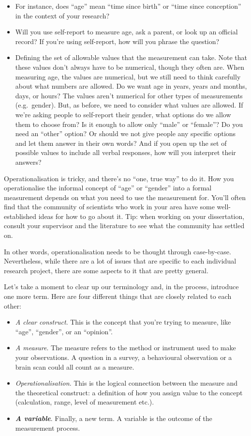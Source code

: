 \documentclass[
  11pt,
]{book}
\providecommand{\tightlist}{%
  \setlength{\itemsep}{0pt}\setlength{\parskip}{0pt}}
\theoremstyle{definition}
\theoremstyle{definition}
\theoremstyle{definition}
\theoremstyle{definition}
\theoremstyle{remark}
\begin{document}
\begin{itemize}
\tightlist
\item
  For instance, does ``age'' mean ``time since birth'' or ``time since conception'' in the context of your research?
\item
  Will you use self-report to measure age, ask a parent, or look up an official record? If you're using self-report, how will you phrase the question?
\item
  Defining the set of allowable values that the measurement can take. Note that these values don't always have to be numerical, though they often are. When measuring age, the values are numerical, but we still need to think carefully about what numbers are allowed. Do we want age in years, years and months, days, or hours? The values aren't numerical for other types of measurements (e.g.~gender). But, as before, we need to consider what values are allowed. If we're asking people to self-report their gender, what options do we allow them to choose from? Is it enough to allow only ``male'' or ``female''? Do you need an ``other'' option? Or should we not give people any specific options and let them answer in their own words? And if you open up the set of possible values to include all verbal responses, how will you interpret their answers?
\end{itemize}

Operationalisation is tricky, and there's no ``one, true way'' to do it. How you operationalise the informal concept of ``age'' or ``gender'' into a formal measurement depends on what you need to use the measurement for. You'll often find that the community of scientists who work in your area have some well-established ideas for how to go about it. Tip: when working on your dissertation, consult your supervisor and the literature to see what the community has settled on.

In other words, operationalisation needs to be thought through case-by-case. Nevertheless, while there are a lot of issues that are specific to each individual research project, there are some aspects to it that are pretty general.

Let's take a moment to clear up our terminology and, in the process, introduce one more term. Here are four different things that are closely related to each other:

\begin{itemize}
\tightlist
\item
  \emph{A clear construct}. This is the concept that you're trying to measure, like ``age'', ``gender'', or an ``opinion''.
\item
  \emph{A measure}. The measure refers to the method or instrument used to make your observations. A question in a survey, a behavioural observation or a brain scan could all count as a measure.
\item
  \emph{Operationalisation}. This is the logical connection between the measure and the theoretical construct: a definition of how you assign value to the concept (calculation, range, level of measurement etc.).
\item
  \textbf{\emph{A variable}}. Finally, a new term. A variable is the outcome of the measurement process.
\end{itemize}
\end{document}
